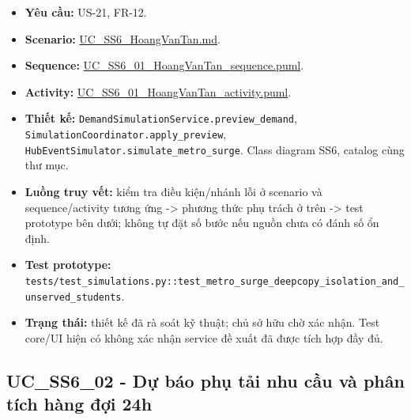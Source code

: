 \documentclass[11pt,a4paper]{article}
\providecommand{\tightlist}{%
  \setlength{\itemsep}{0pt}\setlength{\parskip}{0pt}}
\begin{document}
\begin{itemize}
\tightlist
\item
  \textbf{Yêu cầu:} US-21, FR-12.
\item
  \textbf{Scenario:}
  \href{../../../../docs/diagrams/Use-case\%20detail-scenario/SS6/Usecase\%20scenario/UC_SS6_HoangVanTan.md}{UC\_SS6\_HoangVanTan.md}.
\item
  \textbf{Sequence:}
  \href{../../../../docs/diagrams/Use-case\%20detail-scenario/SS6/Sequence\%20diagrams/UC_SS6_01_HoangVanTan_sequence.puml}{UC\_SS6\_01\_HoangVanTan\_sequence.puml}.
\item
  \textbf{Activity:}
  \href{../../../../docs/diagrams/Use-case\%20detail-scenario/SS6/Activity\%20diagrams/UC_SS6_01_HoangVanTan_activity.puml}{UC\_SS6\_01\_HoangVanTan\_activity.puml}.
\item
  \textbf{Thiết kế:} \texttt{DemandSimulationService.preview\_demand},
  \texttt{SimulationCoordinator.apply\_preview},
  \texttt{HubEventSimulator.simulate\_metro\_surge}. Class diagram SS6,
  catalog cùng thư mục.
\item
  \textbf{Luồng truy vết:} kiểm tra điều kiện/nhánh lỗi ở scenario và
  sequence/activity tương ứng -\textgreater{} phương thức phụ trách ở
  trên -\textgreater{} test prototype bên dưới; không tự đặt số bước nếu
  nguồn chưa có đánh số ổn định.
\item
  \textbf{Test prototype:}
  \texttt{tests/test\_simulations.py::test\_metro\_surge\_deepcopy\_isolation\_and\_unserved\_students}.
\item
  \textbf{Trạng thái:} thiết kế đã rà soát kỹ thuật; chủ sở hữu chờ xác
  nhận. Test core/UI hiện có không xác nhận service đề xuất đã được tích
  hợp đầy đủ.
\end{itemize}

\hypertarget{uc_ss6_02---dux1ef1-buxe1o-phux1ee5-tux1ea3i-nhu-cux1ea7u-vuxe0-phuxe2n-tuxedch-huxe0ng-ux111ux1ee3i-24h}{%
\subsection{UC\_SS6\_02 - Dự báo phụ tải nhu cầu và phân tích hàng đợi
24h}\label{uc_ss6_02---dux1ef1-buxe1o-phux1ee5-tux1ea3i-nhu-cux1ea7u-vuxe0-phuxe2n-tuxedch-huxe0ng-ux111ux1ee3i-24h}}
\end{document}

